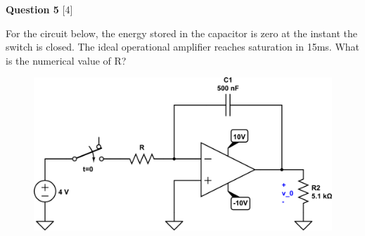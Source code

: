 \documentclass[12pt]{article}
\begin{document}
{\bf Question 5} [4] %

For the circuit below, the energy stored in the capacitor is zero at the instant the switch is closed. The ideal operational amplifier reaches saturation in 15ms. What is the numerical value of R?

\begin{figure}[h!]
\begin{center}
 \includegraphics[scale=0.4]{p7_90.png}
\end{center}
\end{figure}
\end{document}
